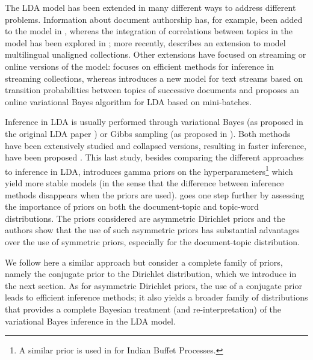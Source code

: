 
The LDA model \cite{blei_latent_2003} has been extended in many different ways to address different problems. Information about document authorship has, for example, been added to the model in \cite{Rosen_Zvi_2004}, whereas the integration of correlations between topics in the model has been explored in \cite{blei_correlated_2007}; more recently, \cite{Boyd_Graber_2009} describes an extension to model multilingual unaligned collections. Other extensions have focused on streaming or online versions of the model: \cite{Yao_2009} focuses on efficient methods for inference in streaming collections, whereas \cite{Wang_2012} introduces a new model for text streams based on transition probabilities between topics of successive documents and \cite{hoffman_online_2010} proposes an online variational Bayes algorithm for LDA based on mini-batches.

Inference in LDA is usually performed through variational Bayes (as proposed in the original LDA paper \cite{blei_latent_2003}) or Gibbs sampling (as proposed in \cite{griffiths04finding}). Both methods have been extensively studied and collapsed versions, resulting in faster inference, have been proposed \cite{teh_collapsed_2006,porteous_fast_2008}. This last study, besides comparing the different approaches to inference in LDA, introduces gamma priors on the hyperparameters\footnote{A similar prior is used in \cite{Gorur_2006} for Indian Buffet Processes.} which yield more stable models (in the sense that the difference between inference methods disappears when the priors are used). \cite{wallach_rethinking_2009} goes one step further by assessing the importance of priors on both the document-topic and topic-word distributions. The priors considered are asymmetric Dirichlet priors and the authors show that the use of such asymmetric priors has substantial advantages over the use of symmetric priors, especially for the document-topic distribution.

We follow here a similar approach but consider a complete family of priors, namely the conjugate prior to the Dirichlet distribution, which we introduce in the next section. As for asymmetric Dirichlet priors, the use of a conjugate prior leads to efficient inference methods; it also yields a broader family of distributions that provides a complete Bayesian treatment (and re-interpretation) of the variational Bayes inference in the LDA model.
